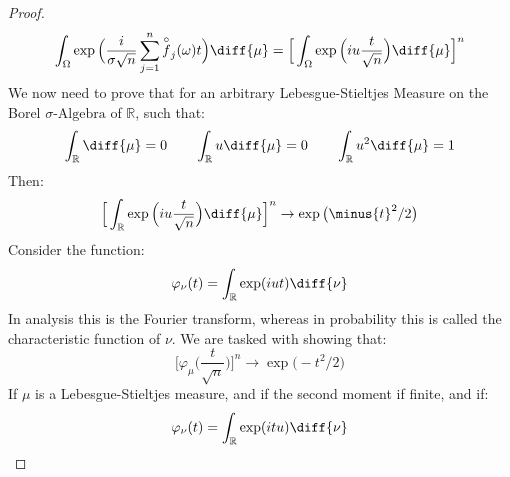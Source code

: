 \begin{proof}
\begin{equation}
                        \int_{\Omega}\exp\Big(
                            \frac{i}{\sigma\sqrt{n}}\sum_{j=1}^{n}
                            \overset{\circ}{f}_{j}(\omega)t\Big)
                            \diff{\mu}=
                        \Big[\int_{\Omega}\exp\Big(
                            iu\frac{t}{\sqrt{n}}\Big)
                            \diff{\mu}\Big]^{n}
                    \end{equation}
                    We now need to prove that for an arbitrary
                    Lebesgue-Stieltjes Measure on the Borel
                    $\sigma\textrm{-Algebra}$ of $\mathbb{R}$,
                    such that:
                    \begin{equation}
                        \int_{\mathbb{R}}\diff{\mu}=0\quad\quad
                        \int_{\mathbb{R}}u\diff{\mu}=0\quad\quad
                        \int_{\mathbb{R}}u^{2}\diff{\mu}=1
                    \end{equation}
                    Then:
                    \begin{equation}
                        \Big[\int_{\mathbb{R}}\exp\Big(
                            iu\frac{t}{\sqrt{n}}\Big)\diff{\mu}\Big]^{n}
                        \rightarrow\exp\big(\minus{t}^{2}/2\big)
                    \end{equation}
                    Consider the function:
                    \begin{equation}
                        \varphi_{\nu}(t)=
                        \int_{\mathbb{R}}\exp(iut)\diff{\nu}
                    \end{equation}
                    In analysis this is the Fourier transform,
                    whereas in probability this is called the
                    characteristic function of $\nu$. We are
                    tasked with showing that:
                    \begin{equation}
                        \Big[\varphi_{\mu}
                            \big(\frac{t}{\sqrt{n}}\big)\Big]^{n}
                        \rightarrow\exp\big(\minus{t}^{2}/2\big)
                    \end{equation}
                    If $\mu$ is a Lebesgue-Stieltjes measure, and
                    if the second moment if finite, and if:
                    \begin{equation}
                        \varphi_{\nu}(t)=
                        \int_{\mathbb{R}}\exp(itu)\diff{\nu}
                    \end{equation}

\end{proof}
